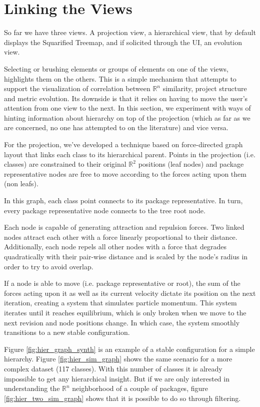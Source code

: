 \section{Linking the Views} \label{sec:linking}
So far we have three views. A projection view, a hierarchical view, that by default displays the Squarified Treemap, and if solicited through the UI, an evolution view.

Selecting or brushing elements or groups of elements on one of the views, highlights them on the others. This is a simple mechanism that attempts to support the visualization of correlation between $\mathbb{R}^{n}$ similarity, project structure and metric evolution. Its downside is that it relies on having to move the user's attention from one view to the next. In this section, we experiment with ways of hinting information about hierarchy on top of the projection (which as far as we are concerned, no one has attempted to on the literature) and vice versa.

For the projection, we've developed a technique based on force-directed graph layout that links each class to its hierarchical parent. Points in the projection (i.e. classes) are constrained to their original $\mathbb{R}^{2}$ positions (leaf nodes) and package representative nodes are free to move according to the forces acting upon them (non leafs).

In this graph, each class point connects to its package representative. In turn, every package representative node connects to the tree root node.

Each node is capable of generating attraction and repulsion forces. Two linked nodes attract each other with a force linearly proportional to their distance. Additionally, each node repels all other nodes with a force that degrades quadratically with their pair-wise distance and is scaled by the node's radius in order to try to avoid overlap.

If a node is able to move (i.e. package representative or root), the sum of the forces acting upon it as well as its current velocity dictate its position on the next iteration, creating a system that simulates particle momentum. This system iterates until it reaches equilibrium, which is only broken when we move to the next revision and node positions change. In which case, the system smoothly transitions to a new stable configuration.

Figure \ref{fig:hier_graph_synth} is an example of a stable configuration for a simple hierarchy. Figure \ref{fig:hier_sim_graph} shows the same scenario for a more complex dataset (117 classes). With this number of classes it is already impossible to get any hierarchical insight. But if we are only interested in understanding the $\mathbb{R}^{n}$ neighborhood of a couple of packages, figure \ref{fig:hier_two_sim_graph} shows that it is possible to do so through filtering.


